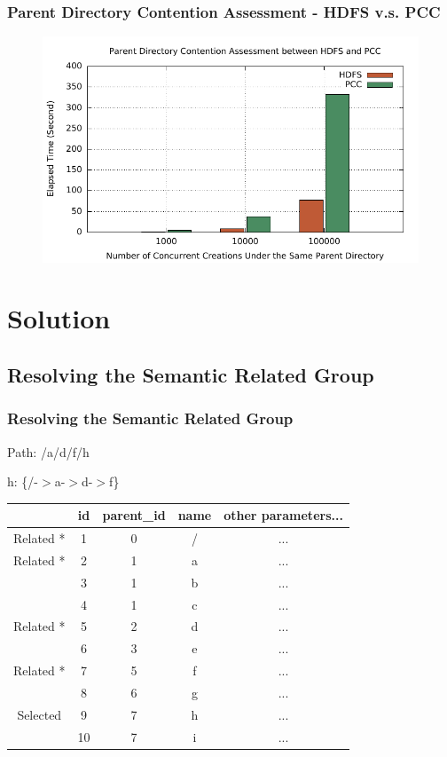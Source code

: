 \documentclass{beamer}
\begin{document}
\begin{frame}
	\frametitle{Parent Directory Contention Assessment - HDFS v.s. PCC}
	\begin{figure}[h]
		\centering
		\includegraphics[width=\linewidth]{figs/hdfs_pcc_parentlock.pdf}
	\end{figure}
\end{frame}

\section{Solution}
\subsection{Resolving the Semantic Related Group}
\begin{frame}
	\frametitle{Resolving the Semantic Related Group}
	\begin{block}{Path: /a/d/f/h}
		\begin{center}
			h: \{/-$>$a-$>$d-$>$f\}
		\end{center}
	\end{block}
	\begin{table}[h]
		\centering
		\begin{tabular}{|c|c|c|c|c|}
			\hline
			~ & \textbf{id} & \textbf{parent\_id} & \textbf{name} & \textbf{other parameters...} \\ \hline
			Related * & 1 & 0 & / & ... \\ \hline
			Related * & 2 & 1 & a & ... \\ \hline
			~ & 3 & 1 & b & ... \\ \hline
			~ & 4 & 1 & c & ... \\ \hline
			Related * & 5 & 2 & d & ... \\ \hline
			~ & 6 & 3 & e & ... \\ \hline
			Related * & 7 & 5 & f & ... \\ \hline
			~ & 8 & 6 & g & ... \\ \hline
			Selected \checkmark & 9 & 7 & h & ... \\ \hline
			~ & 10 & 7 & i & ... \\ \hline
		\end{tabular}
	\end{table}
\end{frame}
\end{document}

